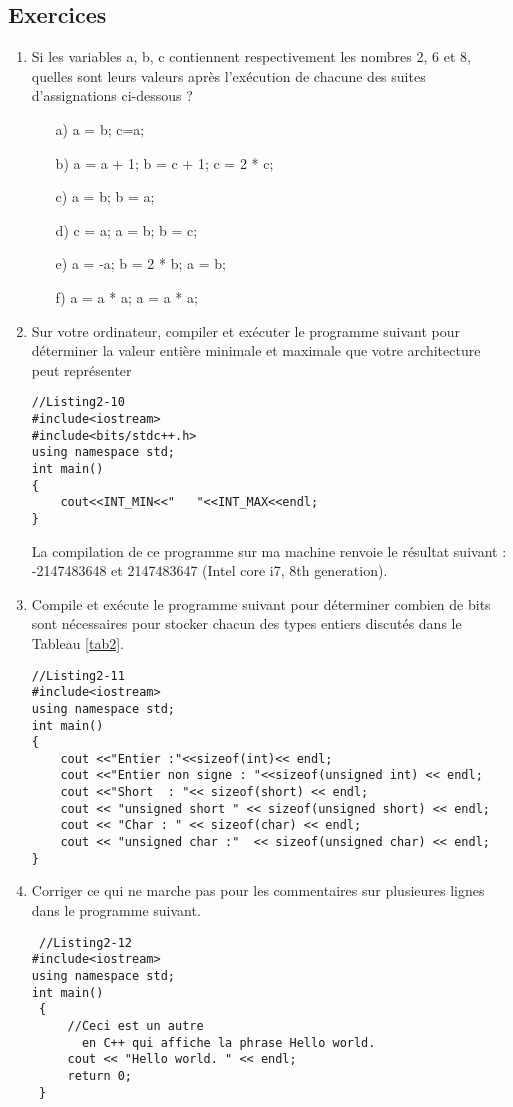 \documentclass[a4paper, oneside,11pt]{book}
\begin{document}
\subsection{Exercices}
 \begin{enumerate}
 \item Si les variables a, b, c contiennent respectivement les nombres 2, 6 et 8, quelles sont leurs valeurs apr\`es l'ex\'ecution de chacune des suites d'assignations ci-dessous ?
 \begin{itemize}
 \item[a) ] a = b; c=a;
 \item[b) ] a = a + 1; b = c + 1; c = 2 * c;
 \item[c) ] a = b; b = a;
 \item[d) ] c = a; a = b; b = c;
 \item[e) ] a = -a; b = 2 * b; a = b;
 \item[f) ] a = a * a; a = a * a;
 \end{itemize}
 \item Sur votre ordinateur, compiler et ex\'ecuter le programme suivant pour d\'eterminer la valeur enti\`ere minimale et maximale que votre architecture peut repr\'esenter
 

\begin{lstlisting}
//Listing2-10
#include<iostream>
#include<bits/stdc++.h>
using namespace std;
int main()
{
    cout<<INT_MIN<<"   "<<INT_MAX<<endl;
}
\end{lstlisting}
La compilation de ce programme sur ma machine renvoie le r\'esultat suivant : -2147483648 et  2147483647 (Intel core i7, 8th generation).
 \item Compile et ex\'ecute le programme suivant pour d\'eterminer combien de bits sont
  n\'ecessaires pour stocker chacun des types entiers discut\'es dans le 
  Tableau \ref{tab2}.
 
\begin{lstlisting}
//Listing2-11
#include<iostream>
using namespace std;
int main()
{
    cout <<"Entier :"<<sizeof(int)<< endl;
    cout <<"Entier non signe : "<<sizeof(unsigned int) << endl;
    cout <<"Short  : "<< sizeof(short) << endl;
    cout << "unsigned short " << sizeof(unsigned short) << endl;
    cout << "Char : " << sizeof(char) << endl;
    cout << "unsigned char :"  << sizeof(unsigned char) << endl;
}
 \end{lstlisting}
 
 \item Corriger ce qui ne marche pas pour les commentaires sur plusieures lignes dans le programme suivant.
 \begin{lstlisting}
 //Listing2-12
#include<iostream>
using namespace std;
int main()
 { 
     //Ceci est un autre 
       en C++ qui affiche la phrase Hello world.
     cout << "Hello world. " << endl;
     return 0;
 }
\end{lstlisting}


\end{enumerate}
\end{document}
